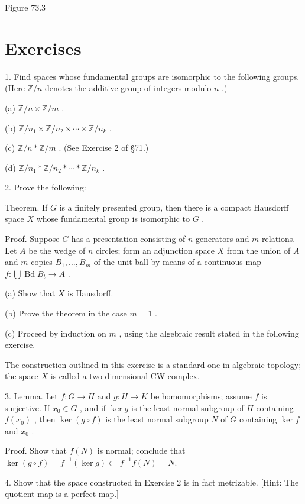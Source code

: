 \documentclass[10pt]{article}
\begin{document}
Figure 73.3

\section*{Exercises}

1. Find spaces whose fundamental groups are isomorphic to the following groups. (Here \(\mathbb{Z}/n\) denotes the additive group of integers modulo \(n\) .)

(a) \(\mathbb{Z}/n \times  \mathbb{Z}/m\) .

(b) \(\mathbb{Z}/{n}_{1} \times  \mathbb{Z}/{n}_{2} \times  \cdots  \times  \mathbb{Z}/{n}_{k}\) .

(c) \(\mathbb{Z}/n * \mathbb{Z}/m\) . (See Exercise 2 of §71.)

(d) \(\mathbb{Z}/{n}_{1} * \mathbb{Z}/{n}_{2} * \cdots  * \mathbb{Z}/{n}_{k}\) .

2. Prove the following:

Theorem. If \(G\) is a finitely presented group, then there is a compact Hausdorff space \(X\) whose fundamental group is isomorphic to \(G\) .

Proof. Suppose \(G\) has a presentation consisting of \(n\) generators and \(m\) relations. Let \(A\) be the wedge of \(n\) circles; form an adjunction space \(X\) from the union of \(A\) and \(m\) copies \({B}_{1},\ldots ,{B}_{m}\) of the unit ball by means of a continuous map \(f : \bigcup \operatorname{Bd}{B}_{t} \rightarrow  A\) .

(a) Show that \(X\) is Hausdorff.

(b) Prove the theorem in the case \(m = 1\) .

(c) Proceed by induction on \(m\) , using the algebraic result stated in the following exercise.

The construction outlined in this exercise is a standard one in algebraic topology; the space \(X\) is called a two-dimensional CW complex.

3. Lemma. Let \(f : G \rightarrow  H\) and \(g : H \rightarrow  K\) be homomorphisms; assume \(f\) is surjective. If \({x}_{0} \in  G\) , and if \(\ker g\) is the least normal subgroup of \(H\) containing \(f\left( {x}_{0}\right)\) , then \(\ker \left( {g \circ  f}\right)\) is the least normal subgroup \(N\) of \(G\) containing \(\ker f\) and \({x}_{0}\) .

Proof. Show that \(f\left( N\right)\) is normal; conclude that \(\ker \left( {g \circ  f}\right)  = {f}^{-1}\left( {\ker g}\right)  \subset \; {f}^{-1}f\left( N\right)  = N.\)

4. Show that the space constructed in Exercise 2 is in fact metrizable. [Hint: The quotient map is a perfect map.]
\end{document}
